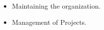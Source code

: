 
\begin{itemize}
    \item Maintaining the organization.
    \item Management of Projects.
\end{itemize}
